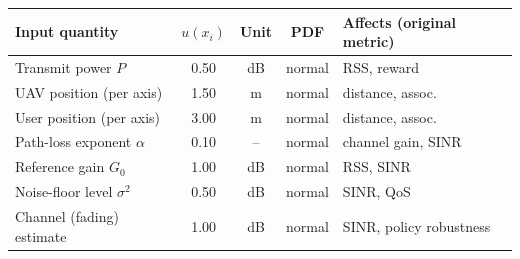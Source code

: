 \begin{tabular}{lcccl}
\hline
\textbf{Input quantity} & \textbf{$u(x_i)$} & \textbf{Unit} & \textbf{PDF} & \textbf{Affects (original metric)} \\
\hline
Transmit power $P$ & 0.50 & dB & normal & RSS, reward \\
UAV position (per axis) & 1.50 & m & normal & distance, assoc. \\
User position (per axis) & 3.00 & m & normal & distance, assoc. \\
Path-loss exponent $\alpha$ & 0.10 & -- & normal & channel gain, SINR \\
Reference gain $G_0$ & 1.00 & dB & normal & RSS, SINR \\
Noise-floor level $\sigma^2$ & 0.50 & dB & normal & SINR, QoS \\
Channel (fading) estimate & 1.00 & dB & normal & SINR, policy robustness \\
\hline
\end{tabular}